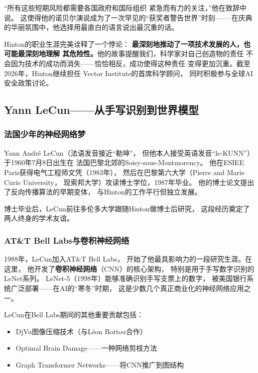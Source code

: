 ``所有这些短期风险都需要各国政府和国际组织
紧急而有力的关注，''他在致辞中说。
这使得他的诺贝尔演说成为了一次罕见的``获奖者警告世界''时刻——
在庆典的华丽氛围中，他选择用最直白的语言说出最沉重的话。

\begin{corebox}
Hinton的职业生涯完美诠释了一个悖论：
\textbf{最深刻地推动了一项技术发展的人，也可能最深刻地理解
其危险性。}他的故事提醒我们，科学家对自己创造物的责任
不会因为技术的成功而消失——恰恰相反，成功使得这种责任
变得更加沉重。截至2026年，Hinton继续担任
Vector Institute的首席科学顾问，
同时积极参与全球AI安全政策讨论。
\end{corebox}

\bigskip

\subsection{Yann LeCun——从手写识别到世界模型}
\label{sec:lecun}

\subsubsection{法国少年的神经网络梦}
Yann Andr\'{e} LeCun（法语发音接近``勒坤''，
但他本人接受英语发音``le-KUNN''）于1960年7月8日出生在
法国巴黎北郊的Soisy-sous-Montmorency。
他在ESIEE Paris获得电气工程师文凭（1983年），
然后在巴黎第六大学（Pierre and Marie Curie University，
现索邦大学）攻读博士学位，1987年毕业。
他的博士论文提出了反向传播算法的早期变体，
与Hinton的工作平行但独立发展。

博士毕业后，LeCun前往多伦多大学跟随Hinton做博士后研究，
这段经历奠定了两人终身的学术友谊。

\subsubsection{AT\&T Bell Labs与卷积神经网络}
1988年，LeCun加入AT\&T Bell Labs，
开始了他最具影响力的一段研究生涯。在这里，
他开发了\textbf{卷积神经网络}（CNN）的核心架构，
特别是用于手写数字识别的LeNet系列。
LeNet-5（1998年）能够准确识别手写支票上的数字，
被美国银行系统广泛部署——在AI的``寒冬''时期，
这是少数几个真正商业化的神经网络应用之一。

LeCun在Bell Labs期间的其他重要贡献包括：
\begin{itemize}[noitemsep]
  \item DjVu图像压缩技术（与L\'{e}on Bottou合作）
  \item Optimal Brain Damage——一种网络剪枝方法
  \item Graph Transformer Networks——将CNN推广到图结构
\end{itemize}

